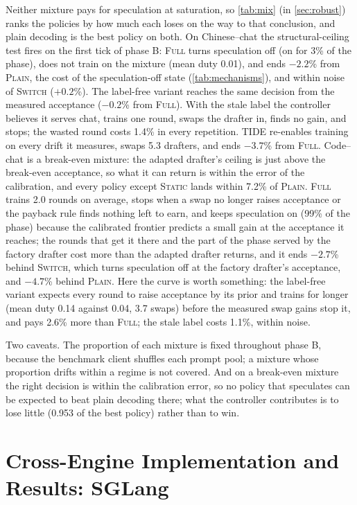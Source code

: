 \documentclass{article}
\newcommand{\pol}[1]{\textsc{#1}}
\begin{document}
Neither mixture pays for speculation at saturation, so \cref{tab:mix} (in \cref{sec:robust}) ranks the policies by how much each loses on the way to that conclusion, and plain decoding is the best policy on both. On Chinese--chat the structural-ceiling test fires on the first tick of phase B: \pol{Full} turns speculation off (on for 3\% of the phase), does not train on the mixture (mean duty 0.01), and ends $-2.2$\% from \pol{Plain}, the cost of the speculation-off state (\cref{tab:mechanisms}), and within noise of \pol{Switch} ($+0.2$\%). The label-free variant reaches the same decision from the measured acceptance ($-0.2$\% from \pol{Full}). With the stale label the controller believes it serves chat, trains one round, swaps the drafter in, finds no gain, and stops; the wasted round costs 1.4\% in every repetition. \pol{TIDE} re-enables training on every drift it measures, swaps 5.3 drafters, and ends $-3.7$\% from \pol{Full}. Code--chat is a break-even mixture: the adapted drafter's ceiling is just above the break-even acceptance, so what it can return is within the error of the calibration, and every policy except \pol{Static} lands within 7.2\% of \pol{Plain}. \pol{Full} trains 2.0 rounds on average, stops when a swap no longer raises acceptance or the payback rule finds nothing left to earn, and keeps speculation on (99\% of the phase) because the calibrated frontier predicts a small gain at the acceptance it reaches; the rounds that get it there and the part of the phase served by the factory drafter cost more than the adapted drafter returns, and it ends $-2.7$\% behind \pol{Switch}, which turns speculation off at the factory drafter's acceptance, and $-4.7$\% behind \pol{Plain}. Here the curve is worth something: the label-free variant expects every round to raise acceptance by its prior and trains for longer (mean duty 0.14 against 0.04, 3.7 swaps) before the measured swap gains stop it, and pays 2.6\% more than \pol{Full}; the stale label costs 1.1\%, within noise.

Two caveats. The proportion of each mixture is fixed throughout phase B, because the benchmark client shuffles each prompt pool; a mixture whose proportion drifts within a regime is not covered. And on a break-even mixture the right decision is within the calibration error, so no policy that speculates can be expected to beat plain decoding there; what the controller contributes is to lose little (0.953 of the best policy) rather than to win.


\FloatBarrier
\section{Cross-Engine Implementation and Results: SGLang}\label{app:sglang}
\end{document}
